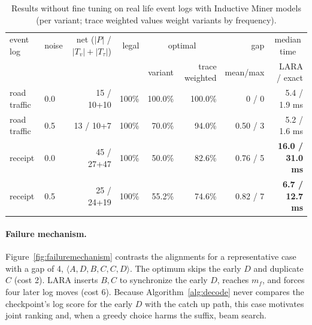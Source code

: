 \documentclass[manuscript,screen,nonacm]{acmart}
\begin{document}
\begin{table}
\caption{Results without fine tuning on real life event logs with Inductive Miner models (per variant; trace weighted values weight variants by frequency).}
\label{tab:reallife}
\footnotesize
\begin{tabular}{llrrrrrr}
\toprule
event log & noise & net ($|P|$ / $|T_v|{+}|T_\tau|$) & legal & \multicolumn{2}{c}{optimal} & gap & \multicolumn{1}{c}{median time} \\
 & & & & variant & trace weighted & mean/max & LARA / exact \\
\midrule
road traffic & 0.0 & 15 / 10+10 & 100\% & 100.0\% & 100.0\% & 0 / 0 & 5.4 / 1.9 ms \\
road traffic & 0.5 & 13 / 10+7  & 100\% &  70.0\% &  94.0\% & 0.50 / 3 & 5.2 / 1.6 ms \\
receipt      & 0.0 & 45 / 27+47 & 100\% &  50.0\% &  82.6\% & 0.76 / 5 & \textbf{16.0 / 31.0 ms} \\
receipt      & 0.5 & 25 / 24+19 & 100\% &  55.2\% &  74.6\% & 0.82 / 7 & \textbf{6.7 / 12.7 ms} \\
\bottomrule
\end{tabular}
\end{table}

\paragraph{Failure mechanism.}
\label{sec:failure}
Figure~\ref{fig:failuremechanism} contrasts the alignments for a representative case with a gap of 4, $\langle A,D,B,C,C,D\rangle$. The optimum skips the early $D$ and duplicate $C$ (cost 2). LARA inserts $B,C$ to synchronize the early $D$, reaches $m_f$, and forces four later log moves (cost 6). Because Algorithm~\ref{alg:decode} never compares the checkpoint's log score for the early $D$ with the catch up path, this case motivates joint ranking and, when a greedy choice harms the suffix, beam search.
\end{document}
